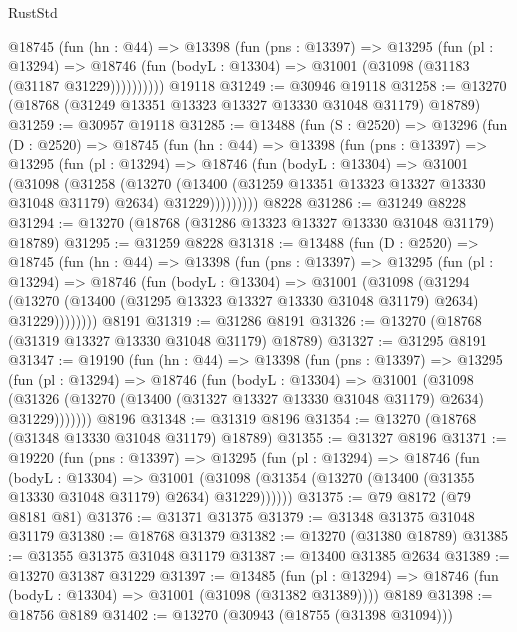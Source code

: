\begin{lexlean}{RustStd}
\begin{coremodule}
        @18745
          (fun (hn : @44) =>
          @13398
            (fun (pns : @13397) =>
            @13295
              (fun (pl : @13294) =>
              @18746 (fun (bodyL : @13304) => @31001 (@31098 (@31183 (@31187 @31229))))))))))
    @19118
@31249 := @30946 @19118
@31258 := @13270 (@18768 (@31249 @13351 @13323 @13327 @13330 @31048 @31179) @18789)
@31259 := @30957 @19118
@31285 := @13488
    (fun (S : @2520) =>
    @13296
      (fun (D : @2520) =>
      @18745
        (fun (hn : @44) =>
        @13398
          (fun (pns : @13397) =>
          @13295
            (fun (pl : @13294) =>
            @18746
              (fun (bodyL : @13304) =>
              @31001
                (@31098
                  (@31258
                    (@13270
                      (@13400 (@31259 @13351 @13323 @13327 @13330 @31048 @31179) @2634)
                      @31229)))))))))
    @8228
@31286 := @31249 @8228
@31294 := @13270 (@18768 (@31286 @13323 @13327 @13330 @31048 @31179) @18789)
@31295 := @31259 @8228
@31318 := @13488
    (fun (D : @2520) =>
    @18745
      (fun (hn : @44) =>
      @13398
        (fun (pns : @13397) =>
        @13295
          (fun (pl : @13294) =>
          @18746
            (fun (bodyL : @13304) =>
            @31001
              (@31098
                (@31294
                  (@13270 (@13400 (@31295 @13323 @13327 @13330 @31048 @31179) @2634) @31229))))))))
    @8191
@31319 := @31286 @8191
@31326 := @13270 (@18768 (@31319 @13327 @13330 @31048 @31179) @18789)
@31327 := @31295 @8191
@31347 := @19190
    (fun (hn : @44) =>
    @13398
      (fun (pns : @13397) =>
      @13295
        (fun (pl : @13294) =>
        @18746
          (fun (bodyL : @13304) =>
          @31001
            (@31098
              (@31326 (@13270 (@13400 (@31327 @13327 @13330 @31048 @31179) @2634) @31229)))))))
    @8196
@31348 := @31319 @8196
@31354 := @13270 (@18768 (@31348 @13330 @31048 @31179) @18789)
@31355 := @31327 @8196
@31371 := @19220
    (fun (pns : @13397) =>
    @13295
      (fun (pl : @13294) =>
      @18746
        (fun (bodyL : @13304) =>
        @31001 (@31098 (@31354 (@13270 (@13400 (@31355 @13330 @31048 @31179) @2634) @31229))))))
@31375 := @79 @8172 (@79 @8181 @81)
@31376 := @31371 @31375
@31379 := @31348 @31375 @31048 @31179
@31380 := @18768 @31379
@31382 := @13270 (@31380 @18789)
@31385 := @31355 @31375 @31048 @31179
@31387 := @13400 @31385 @2634
@31389 := @13270 @31387 @31229
@31397 := @13485
    (fun (pl : @13294) => @18746 (fun (bodyL : @13304) => @31001 (@31098 (@31382 @31389))))
    @8189
@31398 := @18756 @8189
@31402 := @13270 (@30943 (@18755 (@31398 @31094)))

\end{coremodule}
\end{lexlean}
